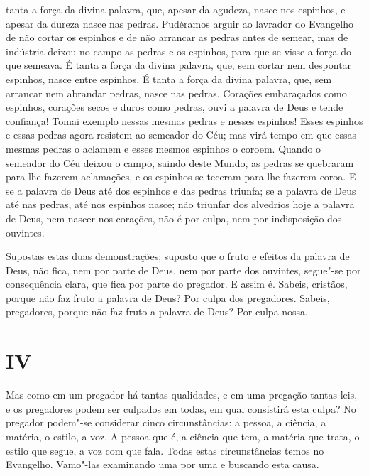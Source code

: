 tanta a força da divina palavra, que, apesar da agudeza, nasce nos
espinhos, e apesar da dureza nasce nas pedras.
Pudéramos arguir ao lavrador do Evangelho de não cortar os espinhos e de
não arrancar as pedras antes de semear, mas de indústria deixou no
campo as pedras e os espinhos, para que se visse a força do que semeava.
É tanta a força da divina palavra, que, sem cortar nem despontar
espinhos, nasce entre espinhos. É tanta a força da divina palavra, que,
sem arrancar nem abrandar pedras, nasce nas pedras. Corações embaraçados
como espinhos, corações secos e duros como pedras, ouvi a palavra de
Deus e tende confiança! Tomai exemplo nessas mesmas pedras e nesses
espinhos! Esses espinhos e essas pedras agora resistem ao semeador do
Céu; mas virá tempo em que essas mesmas pedras o aclamem e esses mesmos
espinhos o coroem.
Quando o semeador do Céu deixou o campo, saindo deste Mundo, as pedras
se quebraram para lhe fazerem aclamações, e os espinhos se teceram para
lhe fazerem coroa. E se a palavra de Deus até dos espinhos e das pedras
triunfa; se a palavra de Deus até nas pedras, até nos espinhos nasce;
não triunfar dos alvedrios hoje a palavra de Deus, nem nascer nos
corações, não é por culpa, nem por indisposição dos ouvintes.

Supostas estas duas demonstrações; suposto que o fruto e efeitos da
palavra de Deus, não fica, nem por parte de Deus, nem por parte dos
ouvintes, segue"-se por consequência clara, que fica por parte do
pregador. E assim é. Sabeis, cristãos, porque não faz fruto a palavra de
Deus? Por culpa dos pregadores. Sabeis, pregadores, porque não faz
fruto a palavra de Deus? Por culpa nossa.

\section{IV}

Mas como em um pregador há tantas qualidades, e em uma pregação tantas
leis, e os pregadores podem ser culpados em todas,
em qual consistirá esta culpa? No pregador podem"-se considerar
cinco circunstâncias: a pessoa, a ciência, a matéria, o estilo, a voz. A
pessoa que é, a ciência que tem, a matéria que trata, o estilo que
segue, a voz com que fala. Todas estas circunstâncias temos no
Evangelho. Vamo"-las examinando uma por uma e buscando esta causa.

